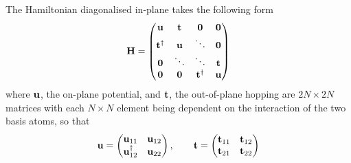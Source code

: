 \documentclass[a4paper, 12pt]{article}
\begin{document}
	The Hamiltonian diagonalised in-plane takes the following form
	\begin{equation}
	\bf	H = \begin{pmatrix} \bf u&\bf t& \bf 0&\bf 0\\\bf t^\dagger&\bf u &\ddots&\bf 0\\\bf 0&\ddots&\ddots&\bf t\\\bf 0&\bf 0&\bf t^\dagger&\bf u\end{pmatrix}
	\end{equation}
	where $\bf u$, the on-plane potential, and $\bf t$, the out-of-plane hopping are $2N\times2N$ matrices with each $N\times N$ element being dependent on the interaction of the two basis atoms, so that
	\begin{equation}
		\bf u = \begin{pmatrix} {\bf u}_{11}&{\bf u}_{12}\\{\bf u}_{12}^\dagger&{\bf u}_{22}\end{pmatrix}, \qquad \bf t = \begin{pmatrix} {\bf t}_{11}&{\bf t}_{12}\\{\bf t}_{21}&{\bf t}_{22}\end{pmatrix}
	\end{equation}
\end{document}
